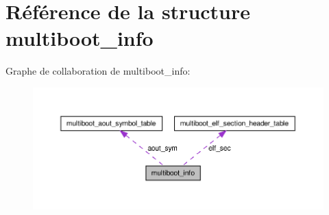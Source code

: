 \hypertarget{structmultiboot__info}{\section{\-Référence de la structure multiboot\-\_\-info}
\label{structmultiboot__info}
}


\-Graphe de collaboration de multiboot\-\_\-info\-:\nopagebreak
\begin{figure}[H]
\begin{center}
\leavevmode
\includegraphics[width=350pt]{structmultiboot__info__coll__graph}
\end{center}
\end{figure}
